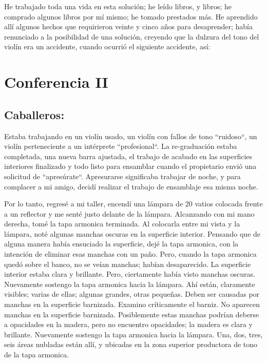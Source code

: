 \documentclass[12pt]{book}
\begin{document}
He trabajado toda una vida en esta solución; he leído libros, y libros; he comprado algunos libros por mí mismo; he tomado prestados más. He aprendido allí algunos hechos que requirieron veinte y cinco años para desaprender; había renunciado a la posibilidad de una solución, creyendo que la dulzura del tono del violín era un accidente, cuando ocurrió el siguiente accidente, así:

\chapter *{Conferencia II}
\section*{Caballeros:}

Estaba trabajando en un violín usado, un violín con fallos de tono ``ruidoso``, un violín perteneciente a un intérprete ``profesional``. La re-graduación estaba completada, una nueva barra ajustada, el trabajo de acabado en las superficies interiores finalizado y todo listo para ensamblar cuando el propietario envió una solicitud de ``apresúrate``. Apresurarse significaba trabajar de noche, y para complacer a mi amigo, decidí realizar el trabajo de ensamblaje esa misma noche.

Por lo tanto, regresé a mi taller, encendí una lámpara de 20 vatios colocada frente a un reflector y me senté justo delante de la lámpara. Alcanzando con mi mano derecha, tomé la tapa armonica terminada. Al colocarla entre mi vista y la lámpara, noté algunas manchas oscuras en la superficie interior. Pensando que de alguna manera había ensuciado la superficie, dejé la tapa armonica, con la intención de eliminar esas manchas con un paño. Pero, cuando la tapa armonica quedó sobre el banco, no se veían manchas; habían desaparecido. La superficie interior estaba clara y brillante. Pero, ciertamente había visto manchas oscuras. Nuevamente sostengo la tapa armonica hacia la lámpara. Ahí están, claramente visibles; varias de ellas; algunas grandes, otras pequeñas. Deben ser causadas por manchas en la superficie barnizada. Examino críticamente el barniz. No aparecen manchas en la superficie barnizada. Posiblemente estas manchas podrían deberse a opacidades en la madera, pero no encuentro opacidades; la madera es clara y brillante. Nuevamente sostengo la tapa armonica hacia la lámpara. Una, dos, tres, seis áreas nubladas están allí, y ubicadas en la zona superior productora de tono de la tapa armonica.
\end{document}
